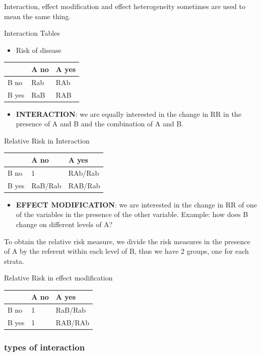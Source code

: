 \documentclass[
]{article}
\providecommand{\tightlist}{%
  \setlength{\itemsep}{0pt}\setlength{\parskip}{0pt}}
\begin{document}
Interaction, effect modification and effect heterogeneity sometimes are
used to mean the same thing.

Interaction Tables

\begin{itemize}
\tightlist
\item
  Risk of disease
\end{itemize}

\begin{longtable}[]{@{}lll@{}}
\toprule
& A no & A yes\tabularnewline
\midrule
\endhead
B no & Rab & RAb\tabularnewline
B yes & RaB & RAB\tabularnewline
\bottomrule
\end{longtable}

\begin{itemize}
\tightlist
\item
  \textbf{INTERACTION}: we are equally interested in the change in RR in
  the presence of A and B and the combination of A and B.
\end{itemize}

Relative Risk in Interaction

\begin{longtable}[]{@{}lll@{}}
\toprule
& A no & A yes\tabularnewline
\midrule
\endhead
B no & 1 & RAb/Rab\tabularnewline
B yes & RaB/Rab & RAB/Rab\tabularnewline
\bottomrule
\end{longtable}

\begin{itemize}
\tightlist
\item
  \textbf{EFFECT MODIFICATION}: we are interested in the change in RR of
  one of the variables in the presence of the other variable. Example:
  how does B change on different levels of A?
\end{itemize}

To obtain the relative risk measure, we divide the risk measures in the
presence of A by the referent within each level of B, thus we have 2
groups, one for each strata.

Relative Risk in effect modification

\begin{longtable}[]{@{}lll@{}}
\toprule
& A no & A yes\tabularnewline
\midrule
\endhead
B no & 1 & RaB/Rab\tabularnewline
B yes & 1 & RAB/RAb\tabularnewline
\bottomrule
\end{longtable}

\hypertarget{types-of-interaction}{%
\subsubsection{types of interaction}\label{types-of-interaction}}
\end{document}

